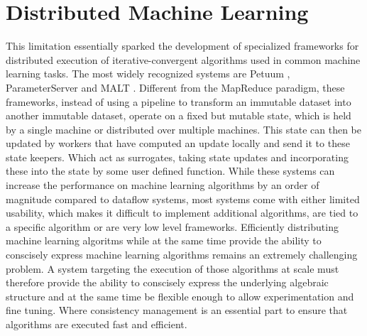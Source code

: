\section{Distributed Machine Learning}
This limitation essentially sparked the development of specialized frameworks for distributed execution of iterative-convergent algorithms used in common machine learning tasks.
The most widely recognized systems are Petuum \cite{Xing2015}, ParameterServer \cite{Li2014} and MALT \cite{Li2015}.
Different from the MapReduce paradigm, these frameworks, instead of using a pipeline to transform an immutable dataset into another immutable dataset, operate on a fixed but mutable state, which is held by a single machine or distributed over multiple machines.
This state can then be updated by workers that have computed an update locally and send it to these state keepers. Which act as surrogates, taking state updates and incorporating these into the state by some user defined function.
While these systems can increase the performance on machine learning algorithms by an order of magnitude \cite{Xing2015} compared to dataflow systems, most systems come with either limited usability, which makes it difficult to implement additional algorithms, are tied to a specific algorithm or are very low level frameworks.
Efficiently distributing machine learning algoritms while at the same time provide the ability to conscisely express machine learning algorithms remains an extremely challenging problem.
A system targeting the execution of those algorithms at scale must therefore provide the ability to conscisely express the underlying algebraic structure and at the same time be flexible enough to allow experimentation and fine tuning.
Where consistency management is an essential part to ensure that algorithms are executed fast and efficient.


